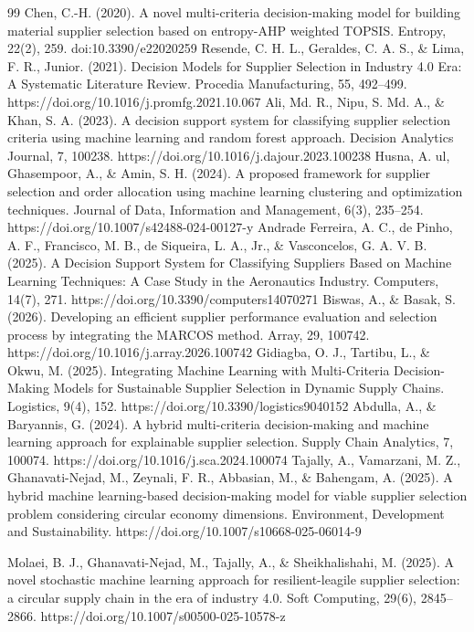 \documentclass[11pt]{article}
\begin{document}
\begin{thebibliography}{99}
 Chen, C.-H. (2020). A novel multi-criteria decision-making model for building material supplier selection based on entropy-AHP weighted TOPSIS. Entropy, 22(2), 259. doi:10.3390/e22020259
 Resende, C. H. L., Geraldes, C. A. S., \& Lima, F. R., Junior. (2021). Decision Models for Supplier Selection in Industry 4.0 Era: A Systematic Literature Review. Procedia Manufacturing, 55, 492--499. https://doi.org/10.1016/j.promfg.2021.10.067
 Ali, Md. R., Nipu, S. Md. A., \& Khan, S. A. (2023). A decision support system for classifying supplier selection criteria using machine learning and random forest approach. Decision Analytics Journal, 7, 100238. https://doi.org/10.1016/j.dajour.2023.100238
 Husna, A. ul, Ghasempoor, A., \& Amin, S. H. (2024). A proposed framework for supplier selection and order allocation using machine learning clustering and optimization techniques. Journal of Data, Information and Management, 6(3), 235--254. https://doi.org/10.1007/s42488-024-00127-y
 Andrade Ferreira, A. C., de Pinho, A. F., Francisco, M. B., de Siqueira, L. A., Jr., \& Vasconcelos, G. A. V. B. (2025). A Decision Support System for Classifying Suppliers Based on Machine Learning Techniques: A Case Study in the Aeronautics Industry. Computers, 14(7), 271. https://doi.org/10.3390/computers14070271
 Biswas, A., \& Basak, S. (2026). Developing an efficient supplier performance evaluation and selection process by integrating the MARCOS method. Array, 29, 100742. https://doi.org/10.1016/j.array.2026.100742
 Gidiagba, O. J., Tartibu, L., \& Okwu, M. (2025). Integrating Machine Learning with Multi-Criteria Decision-Making Models for Sustainable Supplier Selection in Dynamic Supply Chains. Logistics, 9(4), 152. https://doi.org/10.3390/logistics9040152
 Abdulla, A., \& Baryannis, G. (2024). A hybrid multi-criteria decision-making and machine learning approach for explainable supplier selection. Supply Chain Analytics, 7, 100074. https://doi.org/10.1016/j.sca.2024.100074
 Tajally, A., Vamarzani, M. Z., Ghanavati-Nejad, M., Zeynali, F. R., Abbasian, M., \& Bahengam, A. (2025). A hybrid machine learning-based decision-making model for viable supplier selection problem considering circular economy dimensions. Environment, Development and Sustainability. https://doi.org/10.1007/s10668-025-06014-9

 Molaei, B. J., Ghanavati-Nejad, M., Tajally, A., \& Sheikhalishahi, M. (2025). A novel stochastic machine learning approach for resilient-leagile supplier selection: a circular supply chain in the era of industry 4.0. Soft Computing, 29(6), 2845--2866. https://doi.org/10.1007/s00500-025-10578-z


\end{thebibliography}
\end{document}
